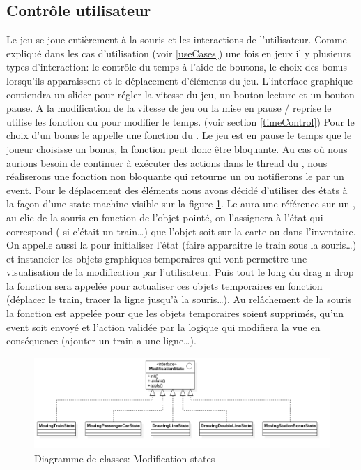 \documentclass[report, backcover, french, nodocumentinfo]{upmethodology-document}
\begin{document}
			\subsection{Contrôle utilisateur}
				Le jeu se joue entièrement à la souris et les interactions de l'utilisateur. Comme expliqué dans les cas d'utilisation (voir \ref{useCases}) une fois en jeux il y plusieurs types d'interaction: le contrôle du temps à l'aide de boutons, le choix des bonus lorsqu’ils apparaissent et le déplacement d'éléments du jeu.
					L'interface graphique contiendra un slider pour régler la vitesse du jeu, un bouton lecture et un bouton pause. A la modification de la vitesse de jeu ou la mise en pause / reprise le  utilise les fonction du  pour modifier le temps. (voir section \ref{timeControl})
					Pour le choix d'un bonus le  appelle une fonction du . Le jeu est en pause le temps que le joueur choisisse un bonus, la fonction peut donc être bloquante. Au cas où nous aurions besoin de continuer à exécuter des actions dans le thread du , nous réaliserons une fonction non bloquante qui retourne un  ou notifierons le  par un event.
					Pour le déplacement des éléments nous avons décidé d'utiliser des états à la façon d'une state machine visible sur la figure \ref{fig:ModificationStatesClassDiagram}. Le  aura une référence sur un , au clic de la souris en fonction de l'objet pointé, on l'assignera à l'état qui correspond ( si c'était un train\ldots) que l'objet soit sur la carte ou dans l'inventaire. On appelle aussi la  pour initialiser l'état (faire apparaitre le train sous la souris\ldots) et instancier les objets graphiques temporaires qui vont permettre une visualisation de la modification par l'utilisateur. Puis tout le long du drag n drop la fonction  sera appelée pour actualiser ces objets temporaires en fonction (déplacer le train, tracer la ligne jusqu’à la souris\ldots). Au relâchement de la souris la fonction  est appelée pour que les objets temporaires soient supprimés, qu'un event soit envoyé et l'action validée par la logique qui modifiera la vue en conséquence (ajouter un train a une ligne\ldots).
					\begin{figure}[h!]
						\centering
						\includegraphics[width=\textwidth]{figures/ModificationStatesClassDiagram}
						\caption{Diagramme de classes: Modification states}
						\label{fig:ModificationStatesClassDiagram}
					\end{figure}
\end{document}
